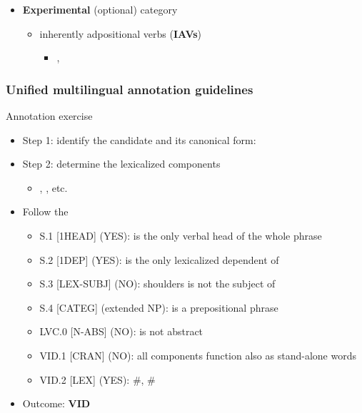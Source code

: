 \documentclass[xcolor=dvipsnames]{beamer}
\begin{document}
\begin{frame}
\begin{frame}
\begin{scriptsize}
\begin{block}{}
\begin{itemize}
\item \textbf{Experimental} (optional) category
   \begin{itemize}
   \item inherently adpositional verbs (\textbf{IAVs})
	\begin{itemize}
	\item[]  , 
	\end{itemize}	
   \end{itemize}
\end{itemize}
\end{block}
\end{scriptsize}

\end{frame}

\begin{frame} 
\frametitle{Unified multilingual annotation guidelines \href{http://parsemefr.lif.univ-mrs.fr/parseme-st-guidelines/1.1}{\beamergotobutton{[link]}}}


\begin{scriptsize}
\begin{block}{Annotation exercise}
\begin{itemize}
\item Step 1: identify the candidate and its canonical form: 
\item Step 2: determine the lexicalized components
   \begin{itemize}
   \item {}, , etc.
   \end{itemize}
\item Follow the \href{http://parsemefr.lif.univ-mrs.fr/parseme-st-guidelines/1.1/?page=040\_Annotation\_process\_-\_decision\_tree}{}
   \begin{itemize}
   \item S.1 [1HEAD] (YES):  is the only verbal head of the whole phrase
   \item S.2 [1DEP] (YES):  is the only lexicalized dependent of 
   \item S.3 [LEX-SUBJ] (NO):  shoulders is not the subject of 
   \item S.4 [CATEG] (extended NP):  is a prepositional phrase
   \item LVC.0 [N-ABS] (NO):  is not abstract
   \item VID.1 [CRAN] (NO): all components function also as stand-alone words
   \item VID.2 [LEX] (YES): \#, \#
   \end{itemize}
\item Outcome: \textbf{VID}
\end{itemize}
\end{block}


\end{scriptsize}
\end{frame}
\end{frame}
\end{document}
